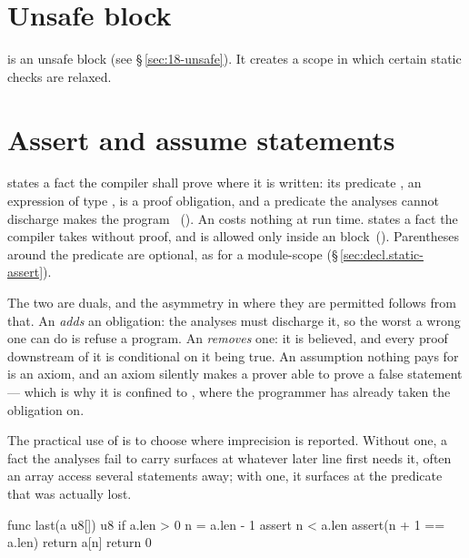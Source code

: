 \section{Unsafe block}
\label{sec:stmt.unsafe}

\pnum
{} is an unsafe block (see \S\,\ref{sec:18-unsafe}).
It creates a scope in which certain static checks are relaxed.

\section{Assert and assume statements}
\label{sec:stmt.assert}

\pnum
{} states a fact the compiler shall prove where it is written: its
predicate , an expression of type , is a proof obligation, and a
predicate the analyses cannot discharge makes the program
\illformed{}~().  An  costs nothing at run time.
 states a fact the compiler takes without proof, and is allowed only
inside an  block~().  Parentheses around the predicate
are optional, as for a module-scope 
(\S\,\ref{sec:decl.static-assert}).

\begin{note}
  The two are duals, and the asymmetry in where they are permitted follows from that.  An
   \emph{adds} an obligation: the analyses must discharge it, so the worst a wrong
  one can do is refuse a program.  An  \emph{removes} one: it is believed, and every
  proof downstream of it is conditional on it being true.  An assumption nothing pays for is an
  axiom, and an axiom silently makes a prover able to prove a false statement --- which is why it
  is confined to , where the programmer has already taken the obligation on.

  The practical use of  is to choose where imprecision is reported.  Without one, a
  fact the analyses fail to carry surfaces at whatever later line first needs it, often an array
  access several statements away; with one, it surfaces at the predicate that was actually lost.
\end{note}

\begin{example}
\begin{laincode}
func last(a u8[]) u8 {
    if a.len > 0 {
        n = a.len - 1
        assert n < a.len
        assert(n + 1 == a.len)
        return a[n]
    }
    return 0
}
\end{laincode}
\end{example}

